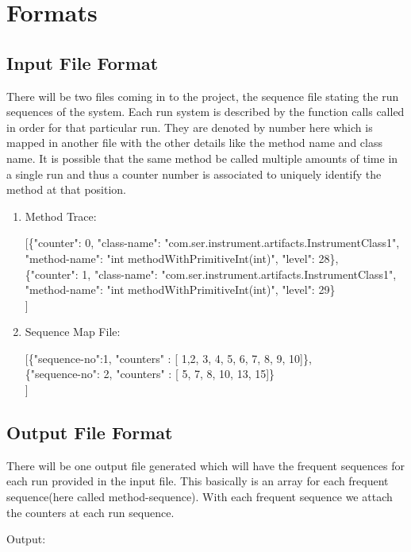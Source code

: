 \section{Formats}
\subsection{Input File Format}
There will be two files coming in to the project, the sequence file stating the run sequences of the system. Each run system is described by the function calls called in order for that particular run. They are denoted by number here which is mapped in another file with the other details like the method name and class name. It is possible that the same method be called multiple amounts of time in a single run and thus a counter number is associated to uniquely identify the method at that position.

\begin{enumerate}
\item Method Trace:

[\{"counter": 0, "class-name": "com.ser.instrument.artifacts.InstrumentClass1", "method-name": "int methodWithPrimitiveInt(int)", "level": 28\},\\
 \{"counter": 1, "class-name": "com.ser.instrument.artifacts.InstrumentClass1", "method-name": "int methodWithPrimitiveInt(int)", "level": 29\}\\
]

\item Sequence Map File:

[\{"sequence-no":1, "counters" : [ 1,2, 3, 4, 5, 6, 7, 8, 9, 10]\},\\
 \{"sequence-no": 2, "counters" : [ 5, 7, 8, 10, 13, 15]\}\\
]

\end{enumerate}

\subsection{Output File Format}
There will be one output file generated which will have the frequent sequences for each run provided in the input file.
This basically is an array for each frequent sequence(here called method-sequence). With each frequent sequence we attach the counters at each run sequence.

Output:

